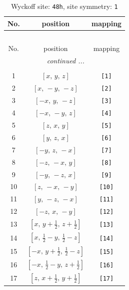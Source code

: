 \documentclass[fleqn,8pt]{jsarticle}
\begin{document}
\begin{longtable}{ccc}
\caption{Wyckoff site: {\tt 48h}, site symmetry: {\tt 1}}
 \\
 \hline \hline
No. & position & mapping \\ \hline \endfirsthead

\multicolumn{2}{l}{\tablename\ \thetable{}} \\
 \hline \hline
No. & position & mapping \\ \hline \endhead

 \hline \hline
\multicolumn{2}{r}{\footnotesize\it continued ...} \\ \endfoot

 \hline \hline
\multicolumn{2}{r}{} \\ \endlastfoot

1 & $\left[ x,\, y,\, z \right]$ & {\tt [1]} \\ \hline
2 & $\left[ x,\, - y,\, - z \right]$ & {\tt [2]} \\ \hline
3 & $\left[ - x,\, y,\, - z \right]$ & {\tt [3]} \\ \hline
4 & $\left[ - x,\, - y,\, z \right]$ & {\tt [4]} \\ \hline
5 & $\left[ z,\, x,\, y \right]$ & {\tt [5]} \\ \hline
6 & $\left[ y,\, z,\, x \right]$ & {\tt [6]} \\ \hline
7 & $\left[ - y,\, z,\, - x \right]$ & {\tt [7]} \\ \hline
8 & $\left[ - z,\, - x,\, y \right]$ & {\tt [8]} \\ \hline
9 & $\left[ - y,\, - z,\, x \right]$ & {\tt [9]} \\ \hline
10 & $\left[ z,\, - x,\, - y \right]$ & {\tt [10]} \\ \hline
11 & $\left[ y,\, - z,\, - x \right]$ & {\tt [11]} \\ \hline
12 & $\left[ - z,\, x,\, - y \right]$ & {\tt [12]} \\ \hline
13 & $\left[ x,\, y + \frac{1}{2},\, z + \frac{1}{2} \right]$ & {\tt [13]} \\ \hline
14 & $\left[ x,\, \frac{1}{2} - y,\, \frac{1}{2} - z \right]$ & {\tt [14]} \\ \hline
15 & $\left[ - x,\, y + \frac{1}{2},\, \frac{1}{2} - z \right]$ & {\tt [15]} \\ \hline
16 & $\left[ - x,\, \frac{1}{2} - y,\, z + \frac{1}{2} \right]$ & {\tt [16]} \\ \hline
17 & $\left[ z,\, x + \frac{1}{2},\, y + \frac{1}{2} \right]$ & {\tt [17]} \\ \hline

\end{longtable}
\end{document}
